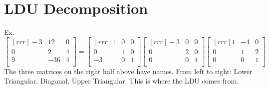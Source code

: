 \documentclass[12pt]{article}
\begin{document}
\section*{LDU Decomposition}

Ex.\\
\[
\begin{bmatrix}[rrr]
-3 & 12 & 0\\
0 & 2 & 4\\
9 & -36 & 4\\
\end{bmatrix}
=
\begin{bmatrix}[rrr]
1 & 0 & 0\\
0 & 1 & 0\\
-3 & 0 & 1\\
\end{bmatrix}
\begin{bmatrix}[rrr]
-3 & 0 & 0\\
0 & 2 & 0\\
0 & 0 & 4\\
\end{bmatrix}
\begin{bmatrix}[rrr]
1 & -4 & 0\\
0 & 1 & 2\\
0 & 0 & 1\\
\end{bmatrix}
\]
The three matrices on the right half above have names. From left to right: Lower Triangular, Diagonal, Upper Triangular. This is where the LDU comes from.\\
\end{document}

